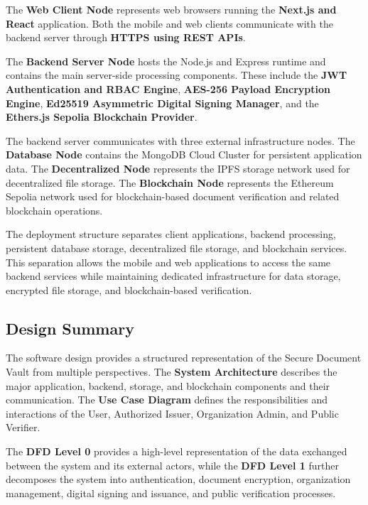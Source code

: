 \documentclass[12pt]{article}
\begin{document}
The \textbf{Web Client Node} represents web browsers running the \textbf{Next.js and React} application. Both the mobile and web clients communicate with the backend server through \textbf{HTTPS using REST APIs}.

The \textbf{Backend Server Node} hosts the Node.js and Express runtime and contains the main server-side processing components. These include the \textbf{JWT Authentication and RBAC Engine}, \textbf{AES-256 Payload Encryption Engine}, \textbf{Ed25519 Asymmetric Digital Signing Manager}, and the \textbf{Ethers.js Sepolia Blockchain Provider}.

The backend server communicates with three external infrastructure nodes. The \textbf{Database Node} contains the MongoDB Cloud Cluster for persistent application data. The \textbf{Decentralized Node} represents the IPFS storage network used for decentralized file storage. The \textbf{Blockchain Node} represents the Ethereum Sepolia network used for blockchain-based document verification and related blockchain operations.

The deployment structure separates client applications, backend processing, persistent database storage, decentralized file storage, and blockchain services. This separation allows the mobile and web applications to access the same backend services while maintaining dedicated infrastructure for data storage, encrypted file storage, and blockchain-based verification.


\subsection{Design Summary}

The software design provides a structured representation of the Secure Document Vault from multiple perspectives. The \textbf{System Architecture} describes the major application, backend, storage, and blockchain components and their communication. The \textbf{Use Case Diagram} defines the responsibilities and interactions of the User, Authorized Issuer, Organization Admin, and Public Verifier.

The \textbf{DFD Level 0} provides a high-level representation of the data exchanged between the system and its external actors, while the \textbf{DFD Level 1} further decomposes the system into authentication, document encryption, organization management, digital signing and issuance, and public verification processes.
\end{document}
